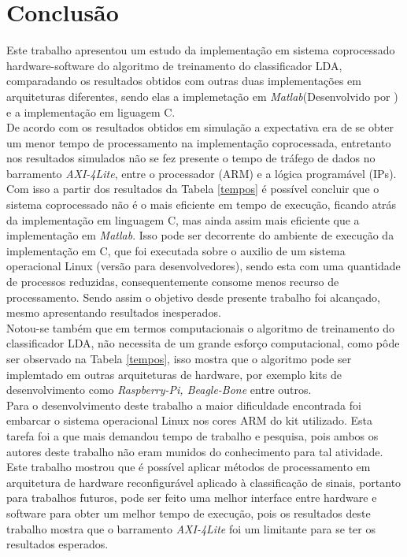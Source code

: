 \chapter[Conclusao]{Conclusão}

Este trabalho apresentou um estudo da implementação em sistema coprocessado hardware-software do algoritmo de treinamento do classificador LDA, comparadando os resultados obtidos com outras duas implementações em arquiteturas diferentes, sendo elas a implemetação em \textit{Matlab}(Desenvolvido por \cite{F.lotte}) e a implementação em liguagem C.\\

De acordo com os resultados obtidos em simulação a expectativa era de se obter um menor tempo de processamento na implementação coprocessada, entretanto nos resultados simulados não se fez presente o tempo de tráfego de dados no barramento \textit{AXI-4Lite}, entre o processador (ARM) e a lógica programável (IPs). Com isso a partir dos resultados da Tabela \ref{tempos} é possível concluir que o sistema coprocessado não é o mais eficiente em tempo de execução, ficando atrás da implementação em linguagem C, mas ainda assim mais eficiente que a implementação em \textit{Matlab}. Isso pode ser decorrente do ambiente de execução da implementação em C, que foi executada sobre o auxilio de um sistema operacional Linux (versão para desenvolvedores), sendo esta com uma quantidade de processos reduzidas, consequentemente consome menos recurso de processamento. Sendo assim o objetivo desde presente trabalho foi
alcançado, mesmo apresentando resultados inesperados.\\

Notou-se também que em termos computacionais o algoritmo de treinamento do classificador LDA, não necessita de um grande esforço computacional, como pôde ser observado na Tabela \ref{tempos}, isso mostra que o algoritmo pode ser implemtado em outras arquiteturas de hardware, por exemplo kits de desenvolvimento como \textit{Raspberry-Pi, Beagle-Bone} entre outros.\\

Para o desenvolvimento deste trabalho a maior dificuldade encontrada foi embarcar o sistema operacional Linux nos cores ARM do kit utilizado. Esta tarefa foi a que mais demandou tempo de trabalho e pesquisa, pois ambos os autores deste trabalho não eram munidos do conhecimento para tal atividade. \\

Este trabalho mostrou que é possível aplicar métodos de processamento em arquitetura de hardware reconfigurável aplicado à classificação de sinais, portanto para trabalhos futuros, pode ser feito uma melhor interface entre hardware e software para obter um melhor tempo de execução, pois os resultados deste trabalho mostra que o barramento \textit{AXI-4Lite} foi um limitante para se ter os resultados esperados. 